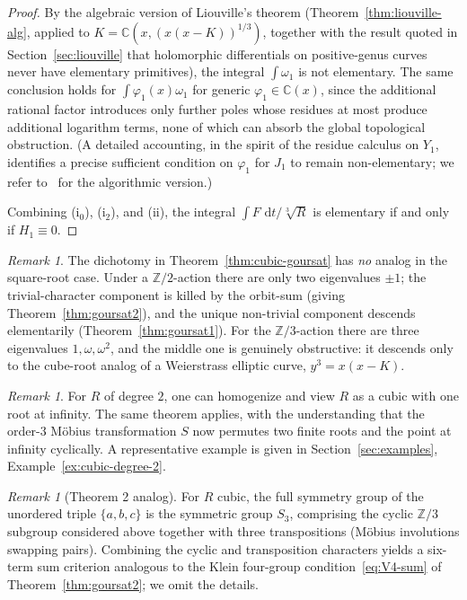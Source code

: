 \documentclass[11pt,a4paper]{article}
\theoremstyle{plain}
\theoremstyle{definition}
\theoremstyle{remark}
\newtheorem{remark}[theorem]{Remark}
\newcommand{\C}{\mathbb{C}}
\newcommand{\Z}{\mathbb{Z}}
\renewcommand{\d}{\,\mathrm{d}}
\begin{document}
\begin{proof}
By the algebraic version of Liouville's theorem (Theorem~\ref{thm:liouville-alg}, applied to $K=\C(x,(x(x-K))^{1/3})$, together with the result quoted in Section~\ref{sec:liouville} that holomorphic differentials on positive-genus curves never have elementary primitives), the integral $\int \omega_1$ is not elementary. The same conclusion holds for $\int \varphi_1(x)\omega_1$ for generic $\varphi_1\in\C(x)$, since the additional rational factor introduces only further poles whose residues at most produce additional logarithm terms, none of which can absorb the global topological obstruction. (A detailed accounting, in the spirit of the residue calculus on $Y_1$, identifies a precise sufficient condition on $\varphi_1$ for $J_1$ to remain non-elementary; we refer to~\cite{Trager1984,Bronstein2005} for the algorithmic version.)

Combining (i$_0$), (i$_2$), and (ii), the integral $\int F\,\d t/\sqrt[3]{R}$ is elementary if and only if $H_1\equiv 0$.
\end{proof}

\begin{remark}
The dichotomy in Theorem~\ref{thm:cubic-goursat} has \emph{no} analog in the square-root case. Under a $\Z/2$-action there are only two eigenvalues $\pm 1$; the trivial-character component is killed by the orbit-sum (giving Theorem~\ref{thm:goursat2}), and the unique non-trivial component descends elementarily (Theorem~\ref{thm:goursat1}). For the $\Z/3$-action there are three eigenvalues $1,\omega,\omega^2$, and the middle one is genuinely obstructive: it descends only to the cube-root analog of a Weierstrass elliptic curve, $y^3 = x(x-K)$.
\end{remark}

\begin{remark}\label{rmk:degree-2}
For $R$ of degree $2$, one can homogenize and view $R$ as a cubic with one root at infinity. The same theorem applies, with the understanding that the order-$3$ M\"obius transformation $S$ now permutes two finite roots and the point at infinity cyclically. A representative example is given in Section~\ref{sec:examples}, Example~\ref{ex:cubic-degree-2}.
\end{remark}

\begin{remark}[Theorem 2 analog]
For $R$ cubic, the full symmetry group of the unordered triple $\{a,b,c\}$ is the symmetric group $S_3$, comprising the cyclic $\Z/3$ subgroup considered above together with three transpositions (M\"obius involutions swapping pairs). Combining the cyclic and transposition characters yields a six-term sum criterion analogous to the Klein four-group condition~\eqref{eq:V4-sum} of Theorem~\ref{thm:goursat2}; we omit the details.
\end{remark}
\end{document}
